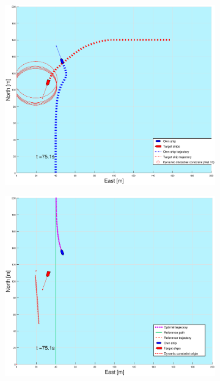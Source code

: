 \begin{figure}[ht]\ContinuedFloat
    \begin{subfigure}[b]{0.49\textwidth}
        \centering
        \includegraphics[width=\textwidth]{Images/Figures/sving_HO/_Simple_0fig1_time=75}
    \end{subfigure}
    \hfill
    \begin{subfigure}[b]{0.499\textwidth}
        \centering
        \includegraphics[width=\textwidth]{Images/Figures/sving_HO/_Simple_0fig999_time=75}

\end{subfigure}
\end{figure}
